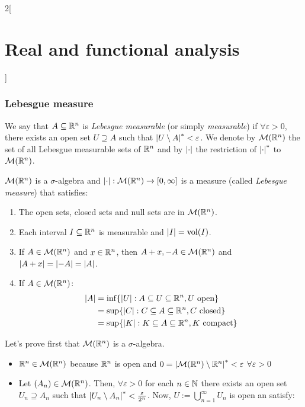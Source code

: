 \documentclass[../../../main_math.tex]{subfiles}
\begin{document}
\begin{multicols}{2}[\section{Real and functional analysis}]
  \subsubsection{Lebesgue measure}
  \begin{definition}
    We say that $A\subseteq\mathbb{R}^n$ is \emph{Lebesgue measurable} (or simply \emph{measurable}) if $\forall \varepsilon>0$, there exists an open set $U\supseteq A$ such that $\om{U\setminus A}<\varepsilon$. We denote by $\mathcal{M}(\mathbb{R}^n)$ the set of all Lebesgue measurable sets of $\mathbb{R}^n$ and by $\m{}$ the restriction of $\om{}$ to ${\mathcal{M}(\mathbb{R}^n)}$.
  \end{definition}
  \begin{theorem}
    $\mathcal{M}(\mathbb{R}^n)$ is a $\sigma$-algebra and $\m{\cdot}:\mathcal{M}(\RR^n)\rightarrow[0,\infty]$ is a measure (called \emph{Lebesgue measure}) that satisfies:
    \begin{enumerate}
      \item The open sets, closed sets and null sets are in $\mathcal{M}(\mathbb{R}^n)$.
      \item Each interval $I\subseteq \mathbb{R}^n$ is measurable and $\m{I}=\vol(I)$.
      \item If $A\in\mathcal{M}(\mathbb{R}^n)$ and $x\in\mathbb{R}^n$, then $A+x,-A\in\mathcal{M}(\mathbb{R}^n)$ and $\m{A+x}=\m{-A}=\m{A}$.
      \item If $A\in\mathcal{M}(\mathbb{R}^n)$:
            \begin{align*}
              \m{A} & =\inf\{\m{U}:A\subseteq U \subseteq\RR^n, U\text{ open}\}   \\
                    & =\sup\{\m{C}:C\subseteq A\subseteq\RR^n, C\text{ closed}\}  \\
                    & =\sup\{\m{K}:K\subseteq A\subseteq\RR^n, K\text{ compact}\}
            \end{align*}
    \end{enumerate}
  \end{theorem}
  \begin{sproof}
    Let's prove first that $\mathcal{M}(\mathbb{R}^n)$ is a $\sigma$-algebra.
    \begin{itemize}
      \item $\mathbb{R}^n\in\mathcal{M}(\mathbb{R}^n)$ because $\mathbb{R}^n$ is open and $0=\om{\mathcal{M}(\RR^n)\setminus\RR^n}<\varepsilon$ $\forall \varepsilon>0$
      \item Let $(A_n)\in\mathcal{M}(\mathbb{R}^n)$. Then, $\forall \varepsilon>0$ for each $n\in\mathbb{N}$ there exists an open set $U_n\supseteq A_n$ such that $\om{U_n\setminus A_n}<\frac{\varepsilon}{2^n}$. Now, $U:=\bigcup_{n=1}^\infty U_n$ is open an satisfy:

\end{itemize}
\end{sproof}
\end{multicols}
\end{document}
